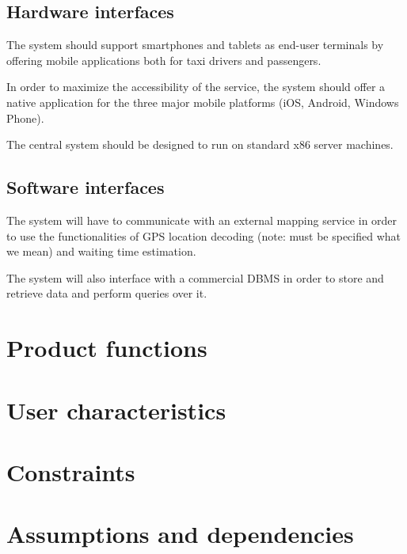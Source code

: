 \subsection{Hardware interfaces}
The system should support smartphones and tablets as end-user terminals by offering mobile applications both for taxi drivers and passengers.

In order to maximize the accessibility of the service, the system should offer a native application for the three major mobile platforms (iOS, Android, Windows Phone).

The central system should be designed to run on standard x86 server machines.


\subsection{Software interfaces}
The system will have to communicate with an external mapping service in order to use the functionalities of GPS location decoding (note: must be specified what we mean) and waiting time estimation.

The system will also interface with a commercial DBMS in order to store and retrieve data and perform queries over it.


\section{Product functions}


\section{User characteristics}


\section{Constraints}

\section{Assumptions and dependencies}
